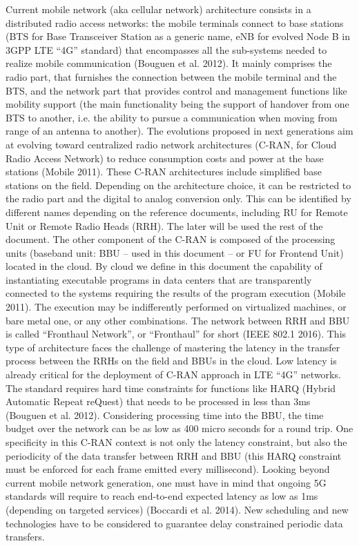 \documentclass[a4paper,10pt]{article}
\begin{document}
Current mobile network (aka cellular network) architecture consists in a distributed radio access networks: the mobile terminals connect to base stations (BTS for Base Transceiver Station as a generic name, eNB for evolved Node B in 3GPP LTE “4G” standard) that encompasses all the sub-systems needed to realize mobile communication (Bouguen et al. 2012). It mainly comprises the radio part, that furnishes the connection between the mobile terminal and the BTS, and the network part that provides control and management functions like mobility support (the main functionality being the support of handover from one BTS to another, i.e. the ability to pursue a communication when moving from range of an antenna to another). The evolutions proposed in next generations aim at evolving toward centralized radio network architectures (C-RAN, for Cloud Radio Access Network) to reduce consumption costs and power at the base stations (Mobile 2011). These C-RAN architectures include simplified base stations on the field. Depending on the architecture choice, it can be restricted to the radio part and the digital to analog conversion only. This can be identified by different names depending on the reference documents, including RU for Remote Unit or Remote Radio Heads (RRH). The later will be used the rest of the document. The other component of the C-RAN is composed of the processing units (baseband unit: BBU – used in this document – or FU for Frontend Unit) located in the cloud. By cloud we define in this document the capability of instantiating executable programs in data centers that are transparently connected to the systems requiring the results of the program execution (Mobile 2011). The execution may be indifferently performed on virtualized machines, or bare metal one, or any other combinations. The network between RRH and BBU is called “Fronthaul Network”, or “Fronthaul” for short (IEEE 802.1 2016). 
This type of architecture faces the challenge of mastering the latency in the transfer process between the RRHs on the field and BBUs in the cloud. Low latency is already critical for the deployment of C-RAN approach in LTE “4G” networks. The standard requires hard time constraints for functions like HARQ (Hybrid Automatic Repeat reQuest) that needs to be processed in less than 3ms (Bouguen et al. 2012). Considering processing time into the BBU, the time budget over the network can be as low as 400 micro seconds for a round trip. One specificity in this C-RAN context is not only the latency constraint, but also the periodicity of the data transfer between RRH and BBU (this HARQ constraint must be enforced for each frame emitted every millisecond). Looking beyond current mobile network generation, one must have in mind that ongoing 5G standards will require to reach end-to-end expected latency as low as 1ms (depending on targeted services) (Boccardi et al. 2014). New scheduling and new technologies have to be considered to guarantee delay constrained periodic data transfers. 
\end{document}
